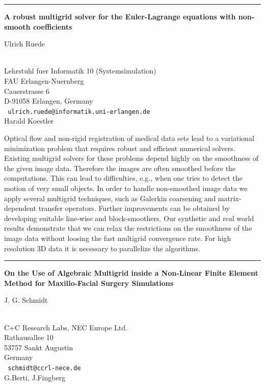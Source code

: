 \documentclass[twosided]{report}
\begin{document}
\begin{center}

\rule{6in}{1pt}
\end{center}

\begin{center}
{\large			\label{ruede}
{\bf
A robust multigrid solver for the Euler-Lagrange equations with
non-smooth coefficients
}

Ulrich Ruede} \\
Lehrstuhl fuer Informatik 10 (Systemsimulation) \\
FAU Erlangen-Nuernberg \\
Cauerstrasse 6 \\
D-91058 Erlangen, Germany
\\ {\tt
ulrich.ruede@informatik.uni-erlangen.de
}
\\
Harald Koestler
\end{center}


Optical flow and non-rigid registration of medical data sets lead to a
variational minimization problem that requires robust and efficient
numerical solvers. Existing multigrid solvers for these problems depend
highly on the smoothness of the given image data. Therefore the images
are often smoothed before the computations. This can lead to
difficulties, e.g., when one tries to detect the motion of very small
objects. In order to handle non-smoothed image data we apply several
multigrid techniques, such as Galerkin coarsening and matrix-dependent
transfer operators. Further improvements can be obtained by developing
suitable line-wise and block-smoothers. Our synthetic and real world
results demonstrate that we can relax the restrictions on the
smoothness of the image data without loosing the fast multigrid
convergence rate. For high resolution 3D data it is necessary to
parallelize the algorithms.

\begin{center}

\rule{6in}{1pt}
\end{center}

\begin{center}
{\large			\label{schmidt}
{\bf
On the Use of Algebraic Multigrid inside a Non-Linear Finite Element
Method for Maxillo-Facial Surgery Simulations
}

J. G. Schmidt} \\
C+C Research Labs, NEC Europe Ltd. \\
Rathausallee 10 \\
53757 Sankt Augustin \\
Germany
\\ {\tt
schmidt@ccrl-nece.de
}
\\
G.Berti,
J.Fingberg
\end{center}
\end{document}
